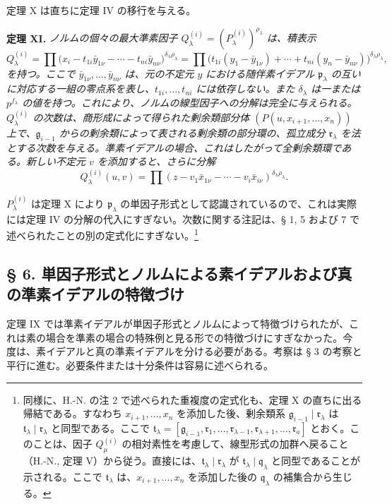 \documentclass[11pt]{article}
\providecommand{\frakp}{\mathfrak p}
\providecommand{\frakq}{\mathfrak q}
\providecommand{\frakr}{\mathfrak r}
\providecommand{\frakg}{\mathfrak g}
\providecommand{\frakt}{\mathfrak t}
\providecommand{\frakp}{\mathfrak p}
\providecommand{\frakq}{\mathfrak q}
\begin{document}
定理 X は直ちに定理 IV の移行を与える。

\textbf{定理 XI.} \emph{ノルムの個々の最大準素因子 $Q_\lambda^{(i)}=(P_\lambda^{(i)})^{\rho_\lambda}$ は、積表示}
\[
 Q_\lambda^{(i)}=\prod \bigl(x_i-t_{1i}\bar y_{1\nu}-\cdots-t_{ni}\bar y_{n\nu}\bigr)^{\delta_\lambda\rho_\lambda}
 =\prod \bigl(t_{1i}(y_1-\bar y_{1\nu})+\cdots+t_{ni}(y_n-\bar y_{n\nu})\bigr)^{\delta_\lambda\rho_\lambda},
\]
\emph{を持つ。ここで $\bar y_{1\nu},\ldots,\bar y_{n\nu}$ は、元の不定元 $y$ における随伴素イデアル $\frakp_\lambda$ の互いに対応する一組の零点系を表し、$t_{1i},\ldots,t_{ni}$ には依存しない。また $\delta_\lambda$ は一または $p^{f_\lambda}$ の値を持つ。これにより、ノルムの線型因子への分解は完全に与えられる。$Q_\lambda^{(i)}$ の次数は、商形成によって得られた剰余類部分体 $(P(u,x_{i+1},\ldots,x_n))$ 上で、$\frakg_{i-1}$ からの剰余類によって表される剰余類の部分環の、孤立成分 $\frakr_\lambda$ を法とする次数を与える。準素イデアルの場合、これはしたがって全剰余類環である。新しい不定元 $v$ を添加すると、さらに分解}
\[
 Q_\lambda^{(i)}(u,v)=\prod (z-v_1\bar x_{1\nu}-\cdots-v_i\bar x_{i\nu})^{\delta_\lambda\rho_\lambda}.
\]

$P_\lambda^{(i)}$ は定理 X により $\frakp_\lambda$ の単因子形式として認識されているので、これは実際には定理 IV の分解の代入にすぎない。次数に関する注記は、§ 1, 5 および 7 で述べられたことの別の定式化にすぎない。\footnote{同様に、H.-N. の注 2 で述べられた重複度の定式化も、定理 X の直ちに出る帰結である。すなわち $x_{i+1},\ldots,x_n$ を添加した後、剰余類系 $\frakg_{i-1}\mid\frakr_\lambda$ は $\frakt_\lambda\mid\frakr_\lambda$ と同型である。ここで $\frakt_\lambda=[\frakg_{i-1},\frakr_1,\ldots,\frakr_{\lambda-1},\frakr_{\lambda+1},\ldots,\frakr_a]$ とおく。このことは、因子 $Q_\mu^{(i)}$ の相対素性を考慮して、線型形式の加群へ戻ること（H.-N., 定理 V）から従う。直接には、$\frakt_\lambda\mid\frakr_\lambda$ が $\frakt_\lambda\mid\frakq_\lambda$ と同型であることが示される。ここで $\frakt_\lambda$ は、$x_{i+1},\ldots,x_n$ を添加した後の $\frakq_\lambda$ の補集合から生じる。}

\subsection*{§ 6. 単因子形式とノルムによる素イデアルおよび真の準素イデアルの特徴づけ}

定理 IX では準素イデアルが単因子形式とノルムによって特徴づけられたが、これは素の場合を準素の場合の特殊例と見る形での特徴づけにすぎなかった。今度は、素イデアルと真の準素イデアルを分ける必要がある。考察は § 3 の考察と平行に進む。必要条件または十分条件は容易に述べられる。
\end{document}
